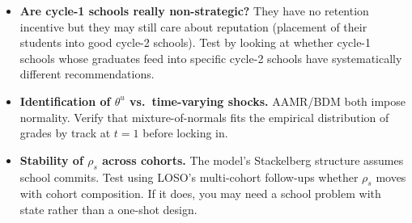 \documentclass{article}
\begin{document}
\begin{itemize}[leftmargin=*]
  \item \textbf{Are cycle-1 schools really non-strategic?}  They have no
  retention incentive but they may still care about reputation
  (placement of their students into good cycle-2 schools). Test by looking
  at whether cycle-1 schools whose graduates feed into specific cycle-2
  schools have systematically different recommendations.
  \item \textbf{Identification of $\theta^u$ vs.\ time-varying shocks.}
  AAMR/BDM both impose normality. Verify that mixture-of-normals fits the
  empirical distribution of grades by track at $t=1$ before locking in.
  \item \textbf{Stability of $\rho_s$ across cohorts.}  The model's
  Stackelberg structure assumes school commits.  Test using LOSO's
  multi-cohort follow-ups whether $\rho_s$ moves with cohort
  composition.  If it does, you may need a school problem with state
  rather than a one-shot design.
\end{itemize}
\end{document}
